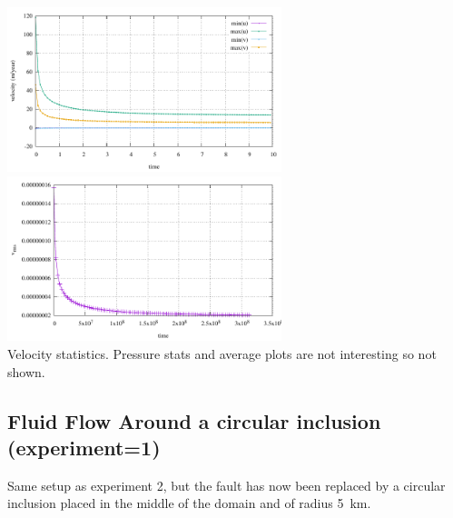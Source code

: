 \begin{center}
\includegraphics[width=8cm]{python_codes/fieldstone_128/results/experiment2/velocity}
\includegraphics[width=8cm]{python_codes/fieldstone_128/results/experiment2/vrms}\\
{\captionfont Velocity statistics. Pressure stats and average plots are not interesting
so not shown.}
\end{center}


\subsection*{Fluid Flow Around a circular inclusion (experiment=1)}

Same setup as experiment 2, but the fault has now been replaced by a circular inclusion 
placed in the middle of the domain and of radius 5~\si{\km}.

